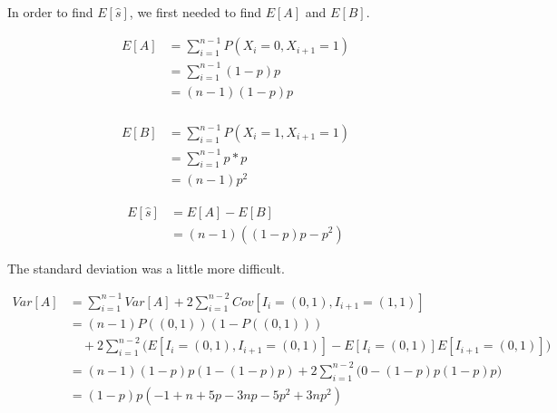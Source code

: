 \documentclass[12pt]{article}
\begin{document}
    In order to find \(E[\hat{s}]\), we first needed to find \(E[A]\) and
    \(E[B]\).

    \begin{equation*}
        \begin{split}
        E[A]& =\sum_{i=1}^{n-1}P(X_i=0,X_{i+1}=1) \\
            & =\sum_{i=1}^{n-1}(1-p)p \\
            & =(n-1)(1-p)p \\
        \end{split}
    \end{equation*}

    \begin{equation*}
        \begin{split}
        E[B]& =\sum_{i=1}^{n-1}P(X_i=1,X_{i+1}=1) \\
            & =\sum_{i=1}^{n-1}p*p \\
            & =(n-1)p^2
        \end{split}
    \end{equation*}

    \begin{equation*}
        \begin{split}
        E[\hat{s}]& =E[A]-E[B] \\
                  & =(n-1)\left((1-p)p-p^2\right)
        \end{split}
    \end{equation*}

    The standard deviation was a little more difficult.  

    \begin{equation*}
        \begin{split}
        Var[A]& =\sum_{i=1}^{n-1}Var[A]+2\sum_{i=1}^{n-2}Cov[I_i=(0,1),I_{i+1}=
                 (1,1)] \\
              & =(n-1)P((0,1))(1-P((0,1))) \\
              & \quad +2\sum_{i=1}^{n-2}\bigg(E[I_i=(0,1),I_{i+1}=(0,1)]-E[I_i=
                (0,1)]E[I_{i+1}=(0,1)]\bigg) \\
              & =(n-1)(1-p)p(1-(1-p)p)+2\sum_{i=1}^{n-2}\bigg(0-(1-p)p(1-p)p
                \bigg) \\
              & =(1-p)p(-1+n+5p-3np-5p^2+3np^2)
        \end{split}
    \end{equation*}
\end{document}
